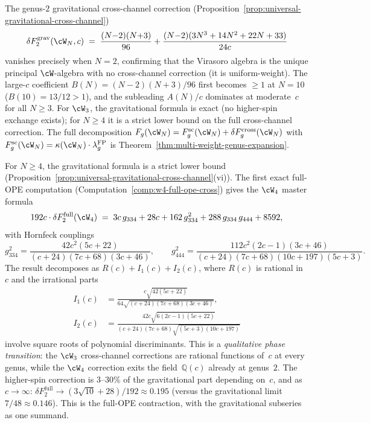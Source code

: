 \begin{remark}%

\label{rem:universal-N-formula-examples}%
%
The genus-$2$ gravitational cross-channel correction
(Proposition~\ref{prop:universal-gravitational-cross-channel})
\[
\delta F_2^{\mathrm{grav}}(\cW_N, c)
\;=\;
\frac{(N{-}2)(N{+}3)}{96}
+ \frac{(N{-}2)(3N^3 + 14N^2 + 22N + 33)}{24c}
\]
vanishes precisely when $N = 2$, confirming that the Virasoro
algebra is the unique principal $\cW$-algebra with no
cross-channel correction (it is uniform-weight).
The large-$c$ coefficient $B(N) = (N{-}2)(N{+}3)/96$
first becomes $\geq 1$ at $N = 10$
($B(10) = 13/12 > 1$), and the subleading
$A(N)/c$ dominates at moderate~$c$ for all $N \geq 3$.
For $\cW_3$, the gravitational formula is exact
(no higher-spin exchange exists); for $N \geq 4$ it is a
strict lower bound on the full cross-channel correction.
The full decomposition
 $F_g(\cW_N) = F_g^{\mathrm{sc}}(\cW_N)
+ \delta F_g^{\mathrm{cross}}(\cW_N)$
with
$F_g^{\mathrm{sc}}(\cW_N)
= \kappa(\cW_N)\cdot\lambda_g^{\mathrm{FP}}$
is Theorem~\ref{thm:multi-weight-genus-expansion}.
\end{remark}

\begin{computation}%
\label{comp:w4-full-ope-examples}%
%
%
%
For $N \geq 4$, the gravitational formula is a strict lower
bound (Proposition~\ref{prop:universal-gravitational-cross-channel}(vi)).
The first exact full-OPE computation
(Computation~\ref{comp:w4-full-ope-cross}) gives the $\cW_4$
master formula
\[
192c \cdot \delta F_2^{\mathrm{full}}(\cW_4)
\;=\;
3c\,g_{334} + 28c + 162\,g_{334}^2
+ 288\,g_{334}\,g_{444} + 8592,
\]
with Hornfeck couplings~\cite{Hornfeck93}
\[
g_{334}^2
= \frac{42c^2(5c+22)}{(c+24)(7c+68)(3c+46)},
\qquad
g_{444}^2
= \frac{112c^2(2c-1)(3c+46)}{(c+24)(7c+68)(10c+197)(5c+3)}.
\]
The result decomposes as $R(c) + I_1(c) + I_2(c)$, where
$R(c)$ is rational in~$c$ and the irrational parts
\begin{align*}
I_1(c) &= \frac{c\sqrt{42(5c+22)}}%
 {64\sqrt{(c+24)(7c+68)(3c+46)}},\\[3pt]
I_2(c) &= \frac{42c\sqrt{6(2c-1)(5c+22)}}%
 {(c+24)(7c+68)\sqrt{(5c+3)(10c+197)}}
\end{align*}
involve square roots of polynomial discriminants. This is a
\emph{qualitative phase transition}: the $\cW_3$ cross-channel
corrections are rational functions of~$c$ at every genus, while
the $\cW_4$ correction exits the field~$\mathbb{Q}(c)$ already
at genus~$2$. The higher-spin correction is $3$--$30\%$ of the
gravitational part depending on~$c$, and as $c \to \infty$:
$\delta F_2^{\mathrm{full}} \to (3\sqrt{10} + 28)/192 \approx 0.195$
\textup{(}versus the gravitational limit $7/48 \approx 0.146$\textup{)}.
This is the full-OPE contraction, with the gravitational subseries as
one summand.
\end{computation}

